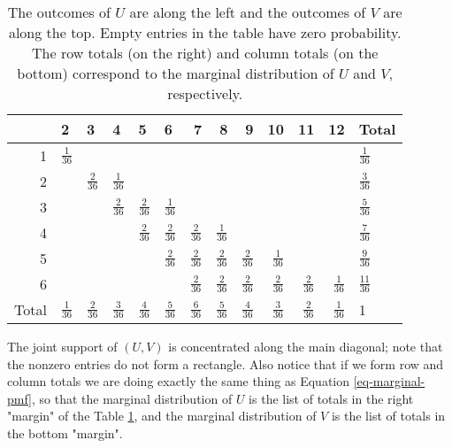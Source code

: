 \begin{table}[htb]
\caption[The joint PMF of \((U,V)\)]{\label{tab-max-sum-joint-pmf}The outcomes of \(U\) are along the left and the outcomes of \(V\) are along the top. Empty entries in the table have zero probability. The row totals (on the right) and column totals (on the bottom) correspond to the marginal distribution of \(U\) and \(V\), respectively.}
\centering
\begin{tabular}{r|lllllrrrrrr|l}
 & 2 & 3 & 4 & 5 & 6 & 7 & 8 & 9 & 10 & 11 & 12 & Total\\
\hline
1 & \(\frac{1}{36}\) &  &  &  &  &  &  &  &  &  &  & \(\frac{1}{36}\)\\
2 &  & \(\frac{2}{36}\) & \(\frac{1}{36}\) &  &  &  &  &  &  &  &  & \(\frac{3}{36}\)\\
3 &  &  & \(\frac{2}{36}\) & \(\frac{2}{36}\) & \(\frac{1}{36}\) &  &  &  &  &  &  & \(\frac{5}{36}\)\\
4 &  &  &  & \(\frac{2}{36}\) & \(\frac{2}{36}\) & \(\frac{2}{36}\) & \(\frac{1}{36}\) &  &  &  &  & \(\frac{7}{36}\)\\
5 &  &  &  &  & \(\frac{2}{36}\) & \(\frac{2}{36}\) & \(\frac{2}{36}\) & \(\frac{2}{36}\) & \(\frac{1}{36}\) &  &  & \(\frac{9}{36}\)\\
6 &  &  &  &  &  & \(\frac{2}{36}\) & \(\frac{2}{36}\) & \(\frac{2}{36}\) & \(\frac{2}{36}\) & \(\frac{2}{36}\) & \(\frac{1}{36}\) & \(\frac{11}{36}\)\\
\hline
Total & \(\frac{1}{36}\) & \(\frac{2}{36}\) & \(\frac{3}{36}\) & \(\frac{4}{36}\) & \(\frac{5}{36}\) & \(\frac{6}{36}\) & \(\frac{5}{36}\) & \(\frac{4}{36}\) & \(\frac{3}{36}\) & \(\frac{2}{36}\) & \(\frac{1}{36}\) & 1\\
\end{tabular}
\end{table}

The joint support of \((U,V)\) is concentrated along the main
diagonal; note that the nonzero entries do not form a rectangle. Also
notice that if we form row and column totals we are doing exactly the
same thing as Equation \eqref{eq-marginal-pmf}, so that the marginal
distribution of \(U\) is the list of totals in the right "margin" of
the Table \ref{tab-max-sum-joint-pmf}, and the marginal distribution of \(V\) is the
list of totals in the bottom "margin".


